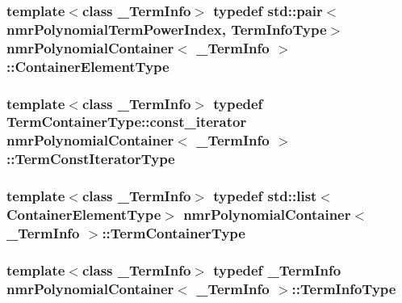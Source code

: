 \subsubsection[{Container\+Element\+Type}]{\setlength{\rightskip}{0pt plus 5cm}template$<$class \+\_\+\+Term\+Info$>$ typedef std\+::pair$<${\bf nmr\+Polynomial\+Term\+Power\+Index}, {\bf Term\+Info\+Type}$>$ {\bf nmr\+Polynomial\+Container}$<$ \+\_\+\+Term\+Info $>$\+::{\bf Container\+Element\+Type}}\label{classnmr_polynomial_container_ae9c399b9034fb32315a644ebb103b4dd}
\hypertarget{classnmr_polynomial_container_aba8d31506ab6a487fdc4fe2815469442}{}
\subsubsection[{Term\+Const\+Iterator\+Type}]{\setlength{\rightskip}{0pt plus 5cm}template$<$class \+\_\+\+Term\+Info$>$ typedef Term\+Container\+Type\+::const\+\_\+iterator {\bf nmr\+Polynomial\+Container}$<$ \+\_\+\+Term\+Info $>$\+::{\bf Term\+Const\+Iterator\+Type}}\label{classnmr_polynomial_container_aba8d31506ab6a487fdc4fe2815469442}
\hypertarget{classnmr_polynomial_container_ae9ba96ffe1b50f1cd84e6728c3a77128}{}
\subsubsection[{Term\+Container\+Type}]{\setlength{\rightskip}{0pt plus 5cm}template$<$class \+\_\+\+Term\+Info$>$ typedef std\+::list$<${\bf Container\+Element\+Type}$>$ {\bf nmr\+Polynomial\+Container}$<$ \+\_\+\+Term\+Info $>$\+::{\bf Term\+Container\+Type}}\label{classnmr_polynomial_container_ae9ba96ffe1b50f1cd84e6728c3a77128}
\hypertarget{classnmr_polynomial_container_acc456652a77699f540082b3f285ac460}{}
\subsubsection[{Term\+Info\+Type}]{\setlength{\rightskip}{0pt plus 5cm}template$<$class \+\_\+\+Term\+Info$>$ typedef \+\_\+\+Term\+Info {\bf nmr\+Polynomial\+Container}$<$ \+\_\+\+Term\+Info $>$\+::{\bf Term\+Info\+Type}}\label{classnmr_polynomial_container_acc456652a77699f540082b3f285ac460}
\hypertarget{classnmr_polynomial_container_a276e57445d038e8a16462f47b85719a3}{}
